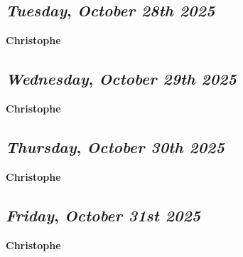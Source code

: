 \def\day{\textit{October 28th 2025}}
\def\weekday{\textit{Tuesday}}
\subsection*{\weekday, \day}
\textbf {Christophe}

\def\day{\textit{October 29th 2025}}
\def\weekday{\textit{Wednesday}}
\subsection*{\weekday, \day}
\textbf {Christophe}

\def\day{\textit{October 30th 2025}}
\def\weekday{\textit{Thursday}}
\subsection*{\weekday, \day}
\textbf {Christophe}

\def\day{\textit{October 31st 2025}}
\def\weekday{\textit{Friday}}
\subsection*{\weekday, \day}
\textbf {Christophe}
